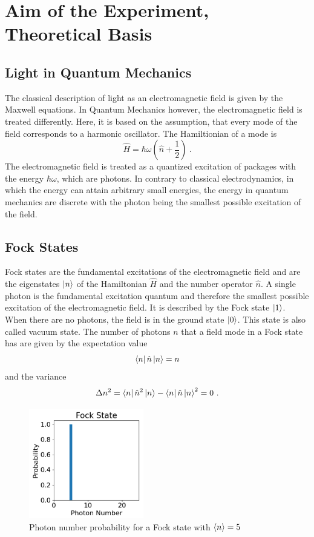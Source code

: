 \chapter{Aim of the Experiment, Theoretical Basis}
\section{Light in Quantum Mechanics}
The classical description of light as an electromagnetic field is given by the Maxwell equations. In Quantum Mechanics however, the electromagnetic field is treated differently. Here, it is based on the assumption, that every mode of the field corresponds to a harmonic oscillator. The Hamiltionian of a mode is 
\begin{equation}
    \hat{H}=\hbar \omega \left(\hat{n}+\frac{1}{2}\right)~.
\end{equation}
The electromagnetic field is treated as a quantized excitation of packages with the energy $\hbar \omega$, which are photons. In contrary to classical electrodynamics, in which the energy can attain arbitrary small energies, the energy in quantum mechanics are discrete with the photon being the smallest possible excitation of the field.

\section{Fock States}
Fock states are the fundamental excitations of the electromagnetic field and are the eigenstates $\ket{n}$ of the Hamiltonian $\hat{H}$ and the number operator $\hat{n}$. A single photon is the fundamental excitation quantum and therefore the smallest possible excitation of the electromagnetic field. It is described by the Fock state $\ket{1}$. When there are no photons, the field is in the ground state $\ket{0}$. This state is also called vacuum state. The number of photons $n$ that a field mode in a Fock state has are given by the expectation value
\begin{equation}
    \bra{n}\hat{n}\ket{n}=n 
\end{equation}
and the variance
\begin{equation}
    \Delta n^{2}=\bra{n}\hat{n}^{2}\ket{n}-\bra{n}\hat{n}\ket{n}^{2}=0~.
\end{equation}
\begin{figure}[H]
    \centering
    \includegraphics[width=50mm,scale=0.5]{Quantenoptik/include/Fock state.PNG}
    \caption{Photon number probability for a Fock state with $\braket{n}=5$} 
    \label{fig:Fock state}
\end{figure}


